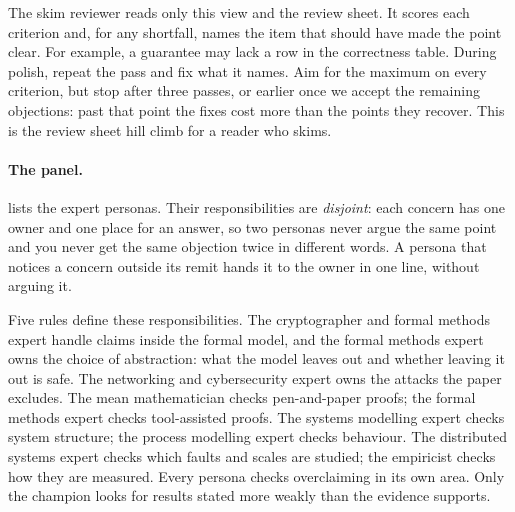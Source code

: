 The skim reviewer reads only this view and the review sheet. It scores each criterion and, for any shortfall, names the item that should have made the point clear. For example, a guarantee may lack a row in the correctness table. During polish, repeat the pass and fix what it names. Aim for the maximum on every criterion, but stop after three passes, or earlier once we accept the remaining objections: past that point the fixes cost more than the points they recover. This is the review sheet hill climb for a reader who skims.

\paragraph{The panel.}  lists the expert personas. Their responsibilities are \emph{disjoint}: each concern has one owner and one place for an answer, so two personas never argue the same point and you never get the same objection twice in different words. A persona that notices a concern outside its remit hands it to the owner in one line, without arguing it.

Five rules define these responsibilities. The cryptographer and formal methods expert handle claims inside the formal model, and the formal methods expert owns the choice of abstraction: what the model leaves out and whether leaving it out is safe. The networking and cybersecurity expert owns the attacks the paper excludes. The mean mathematician checks pen-and-paper proofs; the formal methods expert checks tool-assisted proofs. The systems modelling expert checks system structure; the process modelling expert checks behaviour. The distributed systems expert checks which faults and scales are studied; the empiricist checks how they are measured. Every persona checks overclaiming in its own area. Only the champion looks for results stated more weakly than the evidence supports.

